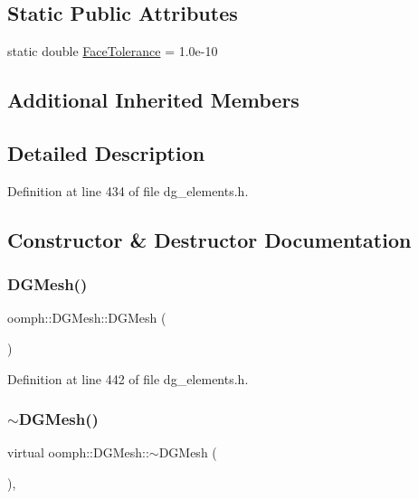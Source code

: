 \subsection*{Static Public Attributes}
\begin{DoxyCompactItemize}
\item 
static double \hyperlink{classoomph_1_1DGMesh_ad130d7e5d2778f37cc032633b73391e5}{Face\+Tolerance} = 1.\+0e-\/10
\end{DoxyCompactItemize}
\subsection*{Additional Inherited Members}


\subsection{Detailed Description}


Definition at line 434 of file dg\+\_\+elements.\+h.



\subsection{Constructor \& Destructor Documentation}
\mbox{\label{classoomph_1_1DGMesh_a6c55e53bed6291fcc188aad8a594c026}} 
\subsubsection{\texorpdfstring{D\+G\+Mesh()}{DGMesh()}}
{\footnotesize\ttfamily oomph\+::\+D\+G\+Mesh\+::\+D\+G\+Mesh (\begin{DoxyParamCaption}{ }\end{DoxyParamCaption})\hspace{0.3cm}{\ttfamily [inline]}}



Definition at line 442 of file dg\+\_\+elements.\+h.

\mbox{\label{classoomph_1_1DGMesh_a26cbcb2fb7d9546ce3c6c4b382b162cd}} 
\subsubsection{\texorpdfstring{$\sim$\+D\+G\+Mesh()}{~DGMesh()}}
{\footnotesize\ttfamily virtual oomph\+::\+D\+G\+Mesh\+::$\sim$\+D\+G\+Mesh (\begin{DoxyParamCaption}{ }\end{DoxyParamCaption})\hspace{0.3cm}{\ttfamily [inline]}, {\ttfamily [virtual]}}



